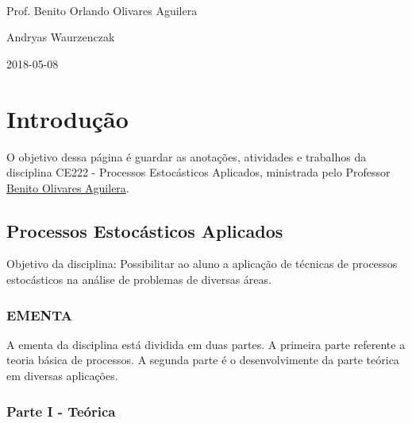 \documentclass[]{article}
\title{}
\author{}
\date{}
\theoremstyle{definition}
\theoremstyle{definition}
\theoremstyle{definition}
\theoremstyle{remark}
\begin{document}
\begin{titlepage}
\\

\vspace{7.5cm}


Prof. Benito Orlando Olivares Aguilera

\vspace{2cm}


Andryas Waurzenczak

\vfill

2018-05-08
\end{titlepage}

{
\setcounter{tocdepth}{2}
\tableofcontents
}

\newpage

\section*{Introdução}\label{introducao}

O objetivo dessa página é guardar as anotações, atividades e trabalhos
da disciplina CE222 - Processos Estocásticos Aplicados, ministrada pelo
Professor \href{https://docs.ufpr.br/~benitoag/}{Benito Olivares
Aguilera}.

\subsection*{Processos Estocásticos
Aplicados}\label{processos-estocasticos-aplicados}

Objetivo da disciplina: Possibilitar ao aluno a aplicação de técnicas de
processos estocásticos na análise de problemas de diversas áreas.

\subsubsection*{EMENTA}\label{ementa}

A ementa da disciplina está dividida em duas partes. A primeira parte
referente a teoria básica de processos. A segunda parte é o
desenvolvimente da parte teórica em diversas aplicações.

\subsubsection*{Parte I - Teórica}\label{parte-i---teorica}
\end{document}
